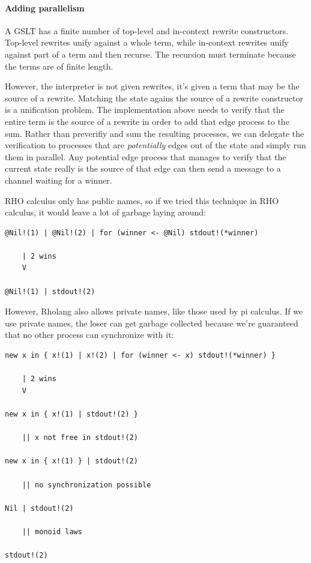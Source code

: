 \documentclass{article}
\begin{document}
\paragraph{Adding parallelism}

A GSLT has a finite number of top-level and in-context rewrite constructors.  Top-level rewrites unify against a whole term, while in-context rewrites unify against part of a term and then recurse.  The recursion must terminate because the terms are of finite length.

However, the interpreter is not given rewrites, it's given a term that may be the source of a rewrite.  Matching the state agains the source of a rewrite constructor is a unification problem.  The implementation above needs to verify that the entire term is the source of a rewrite in order to add that edge process to the sum.  Rather than preverifiy and sum the resulting processes, we can delegate the verification to processes that are {\em potentially} edges out of the state and simply run them in parallel.  Any potential edge process that manages to verify that the current state really is the source of that edge can then send a message to a channel waiting for a winner.

RHO calculus only has public names, so if we tried this technique in RHO calculus, it would leave a lot of garbage laying around:

\begin{verbatim}
@Nil!(1) | @Nil!(2) | for (winner <- @Nil) stdout!(*winner)

    | 2 wins
    V

@Nil!(1) | stdout!(2)
\end{verbatim}

\noindent However, Rholang also allows private names, like those used by pi calculus.  If we use private names, the loser can get garbage collected because we're guaranteed that no other process can synchronize with it:

\begin{verbatim}
new x in { x!(1) | x!(2) | for (winner <- x) stdout!(*winner) }

    | 2 wins
    V

new x in { x!(1) | stdout!(2) }

    || x not free in stdout!(2)

new x in { x!(1) } | stdout!(2)

    || no synchronization possible

Nil | stdout!(2)

    || monoid laws

stdout!(2)
\end{verbatim}
\end{document}
